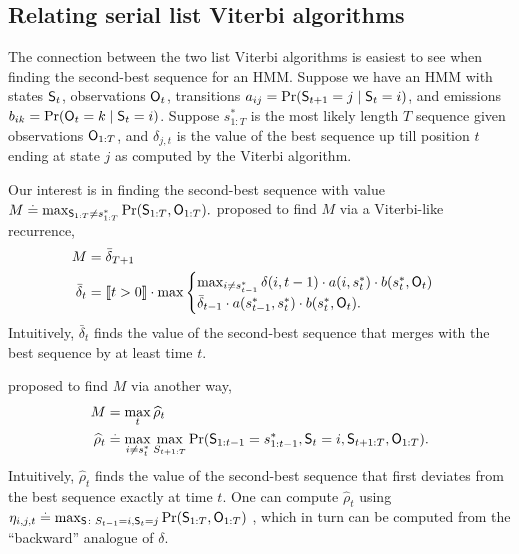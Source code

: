 %
\subsection{Relating serial list Viterbi algorithms}

The connection between the two list Viterbi algorithms is easiest to see when finding the second-best sequence for an HMM.
Suppose we have an HMM with states $\mathsf{S}_{t}$, observations $\mathsf{O}_{t}$, transitions $a_{ij} = \Pr( \mathsf{S}_{t+1} = j \mid \mathsf{S}_t = i )$, and emissions $b_{ik} = \Pr( \mathsf{O}_{t} = k \mid \mathsf{S}_t = i )$.
Suppose $s^*_{1:T}$ is the most likely length $T$ sequence given observations $\mathsf{O}_{1:T}$, and
$\delta_{j, t}$ is the value of the best sequence up till position $t$ ending at state $j$ as computed by the Viterbi algorithm.

Our interest is in finding the second-best sequence %
with value
$ M \stackrel{.}{=} \max_{\mathsf{S}_{1:T} \neq s^*_{1 : T}}{\Pr( \mathsf{S}_{1:T}, \mathsf{O}_{1:T} )}. $
\citet{seshadri1994list} proposed to find $M$ via a Viterbi-like recurrence,
\begin{equation}
    \label{eqn:att-recurrence}
    \begin{aligned}
        M &= \bar{\delta}_{T+1} \\
        \bar{\delta}_t &= 
        \indicator{t > 0} \cdot
        \max
        \begin{cases}
        \max_{i \neq s^*_{t-1}} \delta(i, t-1) \cdot a( i, s^*_{t} ) \cdot b( s^*_{t}, \OSf_{t} ) \\
        \bar{\delta}_{t - 1} \cdot a( s^*_{t - 1}, s^*_{t} ) \cdot b( s^*_{t}, \OSf_{t} ).
        \end{cases}%
    \end{aligned}    
\end{equation}
Intuitively, $\bar{\delta}_t$ finds the value of the second-best sequence that merges with the best sequence by at least time $t$.

\citet{nilsson2001sequentially} proposed to find $M$ via another way,
\begin{align*}
	M &= \max_t \widehat{\rho}_t \\
	\widehat{\rho}_{t} &\stackrel{.}{=} \max_{i \neq s^*_{t}} \max_{S_{t+1:T}} {\Pr( \mathsf{S}_{1:t-1} = s^*_{1:t-1}, \mathsf{S}_t = i, \mathsf{S}_{t+1:T}, \mathsf{O}_{1:T} )}.
\end{align*}
Intuitively, $\widehat{\rho}_t$ finds the value of the second-best sequence that first deviates from the best sequence exactly at time $t$.
One can compute $\widehat{\rho}_{t}$ using $\eta_{i, j, t} \stackrel{.}{=} \max_{\mathsf{S} \colon S_{t - 1} = i, \mathsf{S}_{t} = j} \Pr( \mathsf{S}_{1:T}, \mathsf{O}_{1:T} )$ \citep{nilsson2001sequentially},
which in turn can be computed from the ``backward'' analogue of $\delta$.

